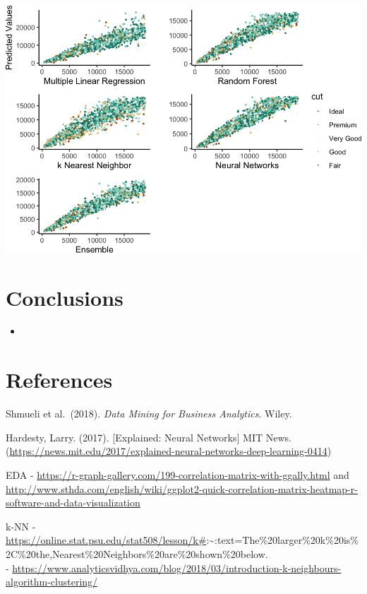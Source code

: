 \documentclass[
  paper=a4,
  ,captions=tableheading
]{scrartcl}
\providecommand{\tightlist}{%
  \setlength{\itemsep}{0pt}\setlength{\parskip}{0pt}}
\begin{document}
\begin{center}\includegraphics{Diamonds_PDF_files/figure-latex/Summ Cut Plots-1} \end{center}

\hypertarget{conclusions}{%
\section{Conclusions}\label{conclusions}}

\begin{itemize}
\tightlist
\item
\end{itemize}

\hypertarget{references}{%
\section{References}\label{references}}

Shmueli et al.~(2018). \emph{Data Mining for Business Analytics}. Wiley.

Hardesty, Larry. (2017). {[}Explained: Neural Networks{]} MIT News.
(\url{https://news.mit.edu/2017/explained-neural-networks-deep-learning-0414})

EDA -
\url{https://r-graph-gallery.com/199-correlation-matrix-with-ggally.html}
and
\url{http://www.sthda.com/english/wiki/ggplot2-quick-correlation-matrix-heatmap-r-software-and-data-visualization}

k-NN -
\url{https://online.stat.psu.edu/stat508/lesson/k\#}:\textasciitilde:text=The\%20larger\%20k\%20is\%2C\%20the,Nearest\%20Neighbors\%20are\%20shown\%20below.\\
-
\url{https://www.analyticsvidhya.com/blog/2018/03/introduction-k-neighbours-algorithm-clustering/}
\end{document}
